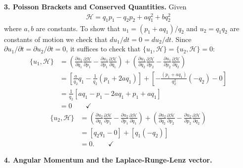 \documentclass{article}
\theoremstyle{definition}
\newcommand{\p}{\partial}
\newcommand{\ham}{\mathcal{H}}
\newcommand{\f}[2]{\frac{#1}{#2}}
\newcommand{\lp}{\left(}
\newcommand{\rp}{\right)}
\newcommand{\lb}{\left[}
\newcommand{\rb}{\right]}
\begin{document}
\noindent \textbf{3. Poisson Brackets and Conserved Quantities.}
Given 
\begin{align*}
\ham = q_1 p_1 - q_2 p_2 + aq_1^2 + bq_2^2 
\end{align*}
where $a,b$ are constants. To show that $u_1 = (p_1+aq_1)/q_2$ and $u_2 = q_1q_2$ are constants of motion we check that $du_1/dt = 0 = du_2/dt$. Since $\p u_1 /\p t = \p u_2 /\p t = 0$, it suffices to check that $\{ u_1,\ham\} = \{ u_2,\ham\} = 0$:
\begin{align*}
\{ u_1, \ham \} 
&= \lp \f{ \p u_1}{\p q_1}\f{\p \ham}{\p p_1} - \f{\p u_1}{\p p_1} \f{\p \ham}{\p q_1}\rp +  \lp \f{ \p u_1}{\p q_2}\f{\p \ham}{\p p_2} - \f{\p u_1}{\p p_2} \f{\p \ham}{\p q_2}\rp \\
&=   \lb\f{a}{q_2}q_1 - \f{1}{q_2}(p_1 + 2aq_1)\rb  + \lb -\f{(p_1+aq_1)}{q_2^2} (-q_2) - 0\rb\\
&= \f{1}{q_2}\lb aq_1 - p_1 - 2aq_1 + p_1 + aq_1 \rb \\
&=0 \quad\quad \checkmark
\end{align*}
\begin{align*}
\{ u_2, \ham \}
&= \lp \f{ \p u_2}{\p q_1}\f{\p \ham}{\p p_1} - \f{\p u_2}{\p p_1} \f{\p \ham}{\p q_1}\rp +  \lp \f{ \p u_2}{\p q_2}\f{\p \ham}{\p p_2} - \f{\p u_2}{\p p_2} \f{\p \ham}{\p q_2}\rp  \\
&= \lb q_2 q_1 - 0 \rb + \lb  q_1 (-q_2)  \rb\\
&= 0. \quad\quad \checkmark
\end{align*}
 

\noindent \textbf{4. Angular Momentum and the Laplace-Runge-Lenz vector.}\\
\end{document}
